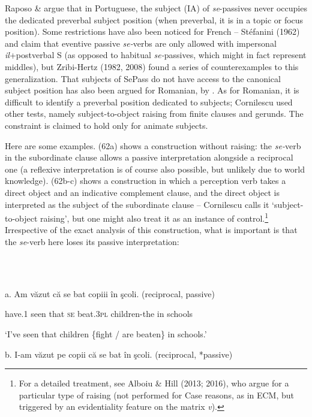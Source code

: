 \documentclass[output=paper]{langsci/langscibook}
\begin{document}
Raposo \& \citet{Uriagereka1996} argue that in Portuguese, the subject (IA) of \textit{se}{}-passives never occupies the dedicated preverbal subject position (when preverbal, it is in a topic or focus position). Some restrictions have also been noticed for French – Stéfanini (1962) and \citet{Ruwet1972} claim that eventive passive \textit{se-}verbs are only allowed with impersonal \textit{il}+postverbal S (as opposed to habitual \textit{se-}passives, which might in fact represent middles), but Zribi-Hertz (1982, 2008) found a series of counterexamples to this generalization. That subjects of SePass do not have access to the canonical subject position has also been argued for Romanian, by \citet{Cornilescu1998}. As for Romanian, it is difficult to identify a preverbal position dedicated to subjects; Cornilescu used other tests, namely subject-to-object raising from finite clauses and gerunds. The constraint is claimed to hold only for animate subjects.

Here are some examples. (62a) shows a construction without raising: the \textit{se-}verb in the subordinate clause allows a passive interpretation alongside a reciprocal one (a reflexive interpretation is of course also possible, but unlikely due to world knowledge). (62b-c) shows a construction in which a perception verb takes a direct object and an indicative complement clause, and the direct object is interpreted as the subject of the subordinate clause – Cornilescu calls it ‘subject-to-object raising’, but one might also treat it as an instance of control.\footnote{For a detailed treatment, see Alboiu \& Hill (2013; 2016), who argue for a particular type of raising (not performed for Case reasons, as in ECM, but triggered by an evidentiality feature on the matrix \textit{v}).} Irrespective of the exact analysis of this construction, what is important is that the \textit{se}{}-verb here loses its passive interpretation:

\ea%
    \label{ex:key:62}
    \gll\\
        \\
    \glt
    \z

          a.   Am     văzut că   se bat          copiii           în şcoli. (reciprocal, passive)    

        have.1 seen that \textsc{se} beat.3\textsc{pl} children-the in schools

         ‘I’ve seen that children \{fight / are beaten\} in schools.’

b.   I-am              văzut pe    copii      că   se  bat         în şcoli. (reciprocal, *passive)
\end{document}
